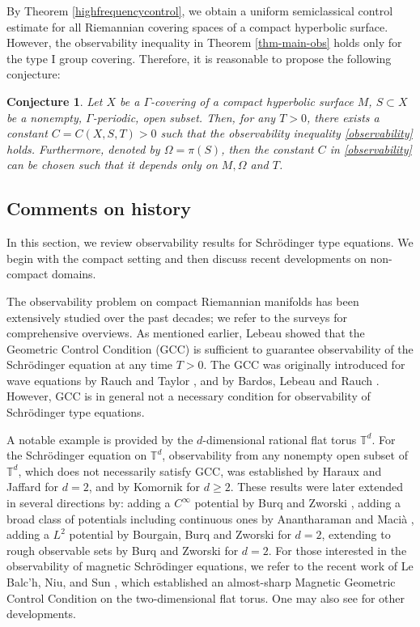 \documentclass[11pt,oneside,reqno]{amsart}
\newcommand\T{\ensuremath{\mathbb{T}}}
\newtheorem{conjecture}[theorem]{Conjecture}
\theoremstyle{definition}
\numberwithin{equation}{section}
\theoremstyle{plain}
\begin{document}
By Theorem \ref{highfrequencycontrol}, we obtain a uniform semiclassical control estimate for all Riemannian covering spaces of a compact hyperbolic surface. However, the observability inequality in Theorem \ref{thm-main-obs} holds only for the type \rm{I} group covering. Therefore, it is reasonable to propose the following conjecture:

\begin{conjecture}
Let $X$ be a $\Gamma$-covering of a compact hyperbolic surface $M$, $S \subset X$ be a nonempty, $\Gamma$-periodic, open subset. Then, for any $T>0$, there exists a constant $C=C(X,S,T)>0$ such that the observability inequality \eqref{observability} holds. Furthermore, denoted by $\Omega=\pi(S)$, then the constant $C$ in \eqref{observability} can be chosen such that it depends only on $M,\Omega$ and $T$.
\end{conjecture}



\subsection{Comments on history}\label{review}

In this section, we review observability results for Schrödinger type equations. We begin with the compact setting and then discuss recent developments on non-compact domains. 

The observability problem on compact Riemannian manifolds has been extensively studied over the past decades; we refer to the surveys \cite{laurent2014internal, macia2015high} for comprehensive overviews. As mentioned earlier, Lebeau \cite{lebeau1992controle} showed that the Geometric Control Condition (GCC) is sufficient to guarantee observability of the Schrödinger equation at any time $T>0$. The GCC was originally introduced for wave equations by Rauch and Taylor \cite{rauch1974exponetial}, and by Bardos, Lebeau and Rauch \cite{bardo1992}. However, GCC is in general not a necessary condition for observability of Schrödinger type equations. 

A notable example is provided by the $d$-dimensional rational flat torus $\T^d$. For the Schrödinger equation on $\T^d$, observability from any nonempty open subset of $\T^d$, which does not necessarily satisfy GCC, was established by Haraux and Jaffard \cite{haraux1989series, jaffard1990controle} for $d=2$, and by Komornik \cite{komornik1992exact} for $d\geq 2$. These results were later extended in several directions by: adding a $C^\infty$ potential by Burq and Zworski \cite{burq2012control}, adding a broad class of potentials including continuous ones by Anantharaman and Macià \cite{anatharaman2014semiclassical},  adding a $L^2$ potential by Bourgain, Burq and Zworski \cite{bourgain2013control} for $d=2$, extending to rough observable sets by Burq and Zworski \cite{burq2019roughcontrols} for $d=2$. For those interested in the observability of magnetic Schrödinger equations, we refer to the recent work of Le Balc'h, Niu, and Sun \cite{balch2025geometric}, which established an almost-sharp Magnetic Geometric Control Condition on the two-dimensional flat torus. One may also see \cite{anatharaman2015semiclassical,macia2021observabilityresults,tao2021exactcontrol} for other developments. 
\end{document}
